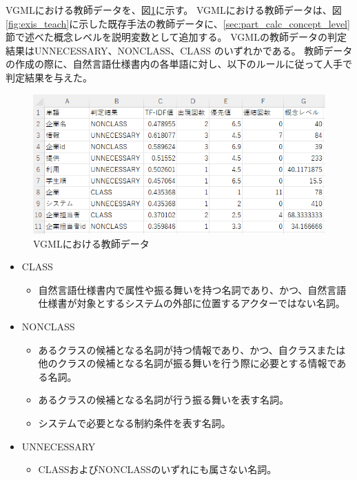 VGMLにおける教師データを、図\ref{fig:vgml_teach}に示す。
VGMLにおける教師データは、図\ref{fig:exis_teach}に示した既存手法の教師データに、\ref{sec:part_calc_concept_level}節で述べた概念レベルを説明変数として追加する。
VGMLの教師データの判定結果はUNNECESSARY、NONCLASS、CLASS のいずれかである。
教師データの作成の際に、自然言語仕様書内の各単語に対し、以下のルールに従って人手で判定結果を与えた。

\begin{figure}[t]
    \begin{center}
        \includegraphics[width=1.0\columnwidth]{image/vgml_teach.png}
        \caption{VGMLにおける教師データ}
        \label{fig:vgml_teach}
    \end{center}
\end{figure}

\begin{itemize}
    \item CLASS
        \begin{itemize}
            \item 自然言語仕様書内で属性や振る舞いを持つ名詞であり、かつ、自然言語仕様書が対象とするシステムの外部に位置するアクターではない名詞。
        \end{itemize}
    \item NONCLASS
        \begin{itemize}
            \item あるクラスの候補となる名詞が持つ情報であり、かつ、自クラスまたは他のクラスの候補となる名詞が振る舞いを行う際に必要とする情報である名詞。
            \item あるクラスの候補となる名詞が行う振る舞いを表す名詞。
            \item システムで必要となる制約条件を表す名詞。
        \end{itemize}
    \item UNNECESSARY
        \begin{itemize}
            \item CLASSおよびNONCLASSのいずれにも属さない名詞。
        \end{itemize}
\end{itemize}

